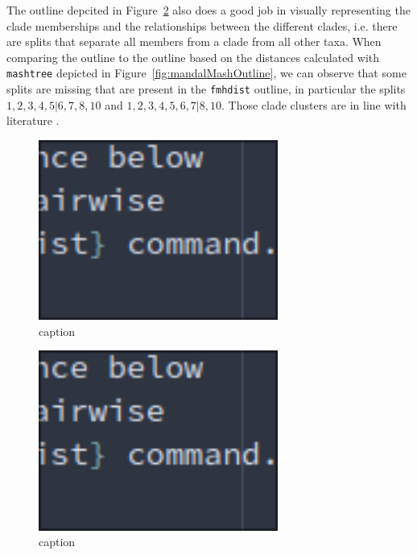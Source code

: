The outline depcited in Figure~\ref{fig:mandalFmhdistOutline} also does a good
job in visually representing the clade memberships and the relationships between
the different clades, i.e. there are splits that separate all members from a
clade from all other taxa. When comparing the outline to the outline based on
the distances calculated with \texttt{mashtree} depicted in
Figure~\ref{fig:mandalMashOutline}, we can observe that some splits are missing
that are present in the \texttt{fmhdist} outline, in particular the splits $1, 2,
3, 4, 5 | 6, 7, 8, 10$ and $1, 2, 3, 4, 5, 6, 7 | 8, 10$. Those clade clusters
are in line with literature
\cite{yangExpandedPhylogenyGenus2017,abadPhytophthoraTaxonomicPhylogenetic2023a}.

\begin{figure}
  \centering
  \includegraphics[width=0.7\textwidth]{figures/image.png}
  \caption{caption}
  \label{fig:mandalFmhdistTree}
\end{figure}

\begin{figure}
  \centering
  \includegraphics[width=0.7\textwidth]{figures/image.png}
  \caption{caption}
  \label{fig:mandalFmhdistOutline}
\end{figure}

